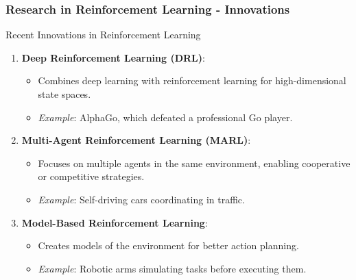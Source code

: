 \documentclass[aspectratio=169]{beamer}
\begin{document}
\begin{frame}[fragile]
    \frametitle{Research in Reinforcement Learning - Innovations}
    \begin{block}{Recent Innovations in Reinforcement Learning}
        \begin{enumerate}
            \item \textbf{Deep Reinforcement Learning (DRL)}:
                \begin{itemize}
                    \item Combines deep learning with reinforcement learning for high-dimensional state spaces.
                    \item \textit{Example}: AlphaGo, which defeated a professional Go player.
                \end{itemize}
            
            \item \textbf{Multi-Agent Reinforcement Learning (MARL)}:
                \begin{itemize}
                    \item Focuses on multiple agents in the same environment, enabling cooperative or competitive strategies.
                    \item \textit{Example}: Self-driving cars coordinating in traffic.
                \end{itemize}
            
            \item \textbf{Model-Based Reinforcement Learning}:
                \begin{itemize}
                    \item Creates models of the environment for better action planning.
                    \item \textit{Example}: Robotic arms simulating tasks before executing them.
                \end{itemize}
        \end{enumerate}
    \end{block}
\end{frame}
\end{document}
